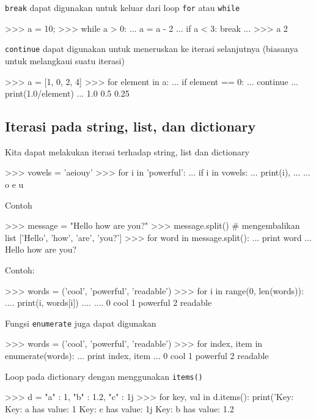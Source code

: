 \documentclass[a4paper,11pt]{extarticle}
\begin{document}
\texttt{break} dapat digunakan untuk
keluar dari loop \texttt{for} atau \texttt{while}
\begin{pyconcode}
>>> a = 10;
>>> while a > 0:
...     a = a - 2
...     if a < 3: break
... 
>>> a
2
\end{pyconcode}


\texttt{continue} dapat digunakan untuk meneruskan ke
iterasi selanjutnya (biasanya untuk melangkaui suatu iterasi)
\begin{pyconcode}
>>> a = [1, 0, 2, 4]
>>> for element in a:
...     if element == 0:
...         continue
...     print(1.0/element)
...     
1.0
0.5
0.25
\end{pyconcode}


\subsection{Iterasi pada string, list, dan dictionary}

Kita dapat melakukan iterasi terhadap string, list dan dictionary
\begin{pyconcode}
>>> vowels = 'aeiouy'
>>> for i in 'powerful':
...     if i in vowels:
...         print(i),
...         
...         
o e u
\end{pyconcode}

Contoh
\begin{pyconcode}
>>> message = "Hello how are you?"
>>> message.split() # mengembalikan list
['Hello', 'how', 'are', 'you?']
>>> for word in message.split():
...     print word
...     
Hello
how
are
you?
\end{pyconcode}

Contoh:
\begin{pyconcode}
>>> words = ('cool', 'powerful', 'readable')
>>> for i in range(0, len(words)):
....     print(i, words[i])
....     
....     
0 cool
1 powerful
2 readable
\end{pyconcode}

Fungsi \texttt{enumerate} juga dapat digunakan
\begin{pyconcode}
>>> words = ('cool', 'powerful', 'readable')
>>> for index, item in enumerate(words):
...     print index, item
...     
0 cool
1 powerful
2 readable
\end{pyconcode}


Loop pada dictionary dengan menggunakan \texttt{items()}
\begin{pyconcode}
>>> d = {"a" : 1, "b" : 1.2, "c" : 1j}
>>> for key, val in d.items():
        print('Key: %
Key: a has value: 1
Key: c has value: 1j
Key: b has value: 1.2
\end{pyconcode}
\end{document}
